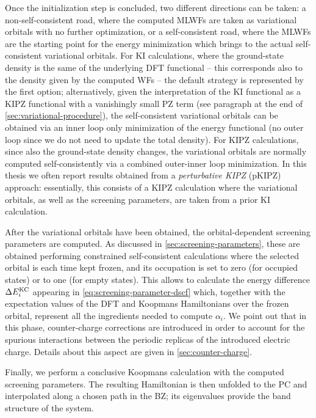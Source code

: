 Once the initialization step is concluded, two different directions can be taken: a non-self-consistent road, where the computed MLWFs are taken as variational orbitals with no further optimization, or a self-consistent road, where the MLWFs are the starting point for the energy minimization which brings to the actual self-consistent variational orbitals. For KI calculations, where the ground-state density is the same of the underlying DFT functional -- this corresponds also to the density given by the computed WFs -- the default strategy is represented by the first option; alternatively, given the interpretation of the KI functional as a KIPZ functional with a vanishingly small PZ term (see paragraph at the end of \cref{sec:variational-procedure}), the self-consistent variational orbitals can be obtained via an inner loop only minimization of the energy functional (no outer loop since we do not need to update the total density). For KIPZ calculations, since also the ground-state density changes, the variational orbitals are normally computed self-consistently via a combined outer-inner loop minimization. In this thesis we often report results obtained from a \emph{perturbative KIPZ} (pKIPZ) approach: essentially, this consists of a KIPZ calculation where the variational orbitals, as well as the screening parameters, are taken from a prior KI calculation.

After the variational orbitals have been obtained, the orbital-dependent screening parameters are computed. As discussed in \cref{sec:screening-parameters}, these are obtained performing constrained self-consistent calculations where the selected orbital is each time kept frozen, and its occupation is set to zero (for occupied states) or to one (for empty states). This allows to calculate the energy difference $\Delta E^{\rm KC}_i$ appearing in \cref{eq:screening-parameter-dscf} which, together with the expectation values of the DFT and Koopmans Hamiltonians over the frozen orbital, represent all the ingredients needed to compute $\alpha_i$. We point out that in this phase, counter-charge corrections are introduced in order to account for the spurious interactions between the periodic replicas of the introduced electric charge. Details about this aspect are given in \cref{sec:counter-charge}.

Finally, we perform a conclusive Koopmans calculation with the computed screening parameters. The resulting Hamiltonian is then unfolded to the PC and interpolated along a chosen path in the BZ; its eigenvalues provide the band structure of the system.

